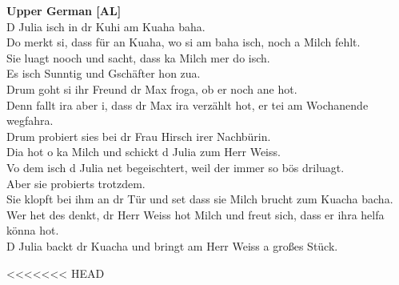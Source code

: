 \documentclass[output=paper]{LSP/langsci}
\begin{document}
{\noindent\textbf{Upper German [AL]}\\
D Julia isch in dr Kuhi am Kuaha baha.\\
Do merkt si, dass f\"ur an Kuaha, wo si am baha isch, noch a Milch fehlt.\\
Sie luagt nooch und sacht, dass ka Milch mer do isch.\\
Es isch Sunntig und Gsch\"after hon zua.\\
Drum goht si ihr Freund dr Max froga, ob er noch ane hot.\\
Denn fallt ira aber i, dass dr Max ira verz\"ahlt hot, er tei am Wochanende wegfahra.\\
Drum probiert sies bei dr Frau Hirsch irer Nachb\"urin.\\
Dia hot o ka Milch und schickt d Julia zum Herr Weiss.\\
Vo dem isch d Julia net begeischtert, weil der immer so b\"os driluagt.\\
Aber sie probierts trotzdem.\\
Sie klopft bei ihm an dr T\"ur und set dass sie Milch brucht zum Kuacha bacha.\\
Wer het des denkt, dr Herr Weiss hot Milch und freut sich, dass er ihra helfa k\"onna hot.\\
D Julia backt dr Kuacha und bringt am Herr Weiss a großes St\"uck.\\
}

\printbibliography[heading=subbibliography,notkeyword=this]
<<<<<<< HEAD
\end{document}
